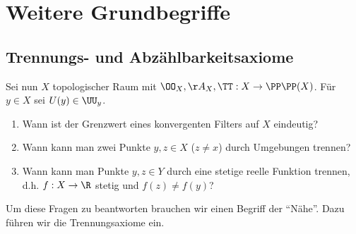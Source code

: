 \section{Weitere Grundbegriffe}

\subsection{Trennungs- und Abzählbarkeitsaxiome}

Sei nun $X$ topologischer Raum mit $\OO_X,\AA_X, \TT: X\to\PP\PP(X)$. Für
$y\in X$ sei $U(y) \in\UU_y$.

\begin{prop}[Fragen]
\label{prop:2.1.2}
\begin{enumerate}
  \item Wann ist der Grenzwert eines konvergenten Filters auf $X$ eindeutig?
  \item Wann kann man zwei Punkte $y,z\in X$ ($z\neq x$) durch Umgebungen
  trennen?
  \item Wann kann man Punkte $y,z\in Y$ durch eine stetige reelle Funktion
  trennen, d.h. $f: X\to \R$ stetig und $f(z)\neq f(y)$?\fishhere
\end{enumerate}
\end{prop}
Um diese Fragen zu beantworten brauchen wir einen Begriff der ``Nähe''. Dazu
führen wir die Trennungsaxiome ein.

